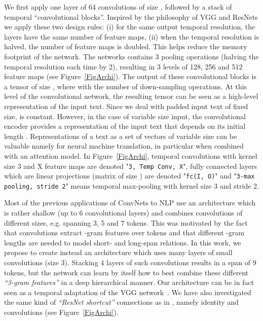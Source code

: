 \documentclass[a4paper,11pt]{article}
\newcommand{\eg}{e.g. }
\begin{document}
We first apply one layer of 64 convolutions of size , followed by
a stack of temporal ``convolutional blocks''. Inspired by the philosophy of VGG
and ResNets we apply these two design rules: (i) for the same output temporal
resolution, the layers have the same number of feature maps, (ii) when the
temporal resolution is halved, the number of feature maps is doubled. This helps reduce the memory footprint of the network.  The networks contains 3 pooling operations (halving the temporal
resolution each time by 2), resulting in 3 levels of 128, 256 and 512 feature
maps (see Figure~\ref{FigArchi}).
The output of these convolutional blocks is a tensor of size ,
where  with  the number of down-sampling
operations. At this level of the convolutional network, the resulting tensor
can be seen as a high-level representation of the input text. Since we deal
with padded input text of fixed size,  is constant. However, in the case
of variable size input, the convolutional encoder provides a representation of
the input text that depends on its initial length . Representations of a
text as a set of vectors of variable size can be valuable namely for neural
machine translation, in particular when combined with an attention model.
In Figure~\ref{FigArchi},
temporal convolutions with kernel size 3 and X feature maps are denoted
"\texttt{3, Temp Conv, X}", fully connected layers which are linear projections
(matrix of size ) are denoted "\texttt{fc(I, O)}" and "\texttt{3-max
pooling, stride 2}" means temporal max-pooling with kernel size 3 and stride 2.

Most of the previous applications of ConvNets to NLP use an architecture which is
rather shallow (up to 6 convolutional layers) and combines convolutions of
different sizes, \eg spanning 3, 5 and 7 tokens. This was motivated by the fact
that convolutions extract -gram features over tokens and that different
-gram lengths are needed to model short- and long-span relations.  In this
work, we propose to create instead an architecture which uses many layers of small
convolutions (size 3). Stacking 4 layers of such convolutions
results in a span of 9 tokens, but the network can learn by itself how to best
combine these different \textit{``3-gram features''} in a deep hierarchical
manner.
Our architecture can be in fact seen as a temporal adaptation of the VGG
network~\cite{msr:2016:iclr:vgg}.  We have also investigated the same kind of
\textit{``ResNet shortcut''} connections as in \cite{He:2015:resnet},
namely identity and  convolutions (see Figure~\ref{FigArchi}).
\end{document}
